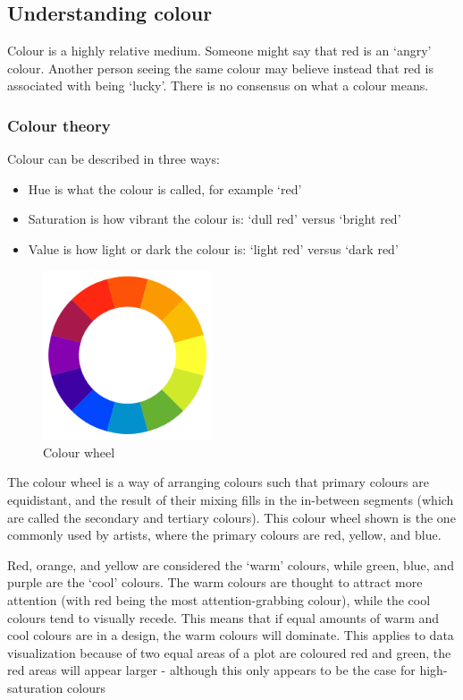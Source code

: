 \documentclass[letterpaper]{report}\usepackage[]{graphicx}\usepackage[]{color}
\begin{document}
\subsection{Understanding colour}
Colour is a highly relative medium. Someone might say that red is an `angry' colour. Another person seeing the same colour may believe instead that red is associated with being `lucky'. There is no consensus on what a colour means. 

\subsubsection{Colour theory}
Colour can be described in three ways:
\begin{itemize}
\item Hue is what the colour is called, for example `red'
\item Saturation is how vibrant the colour is: `dull red' versus `bright red'
\item Value is how light or dark the colour is: `light red' versus `dark red'
\end{itemize}

\begin{figure}[!ht]
  \begin{center}
     \includegraphics[width=50mm]{Figures/colour_wheel.png}
     \caption{Colour wheel}
  \end{center}
\end{figure}

The colour wheel is a way of arranging colours such that primary colours are equidistant, and the result of their mixing fills in the in-between segments (which are called the secondary and tertiary colours). This colour wheel shown is the one commonly used by artists, where the primary colours are red, yellow, and blue. 

Red, orange, and yellow are considered the `warm' colours, while green, blue, and purple are the `cool' colours. The warm colours are thought to attract more attention (with red being the most attention-grabbing colour), while the cool colours tend to visually recede. This means that if equal amounts of warm and cool colours are in a design, the warm colours will dominate. This applies to data visualization because of two equal areas of a plot are coloured red and green, the red areas will appear larger \cite{tedford} - although this only appears to be the case for high-saturation colours \cite{cleveland-colour-illusion}
\end{document}
